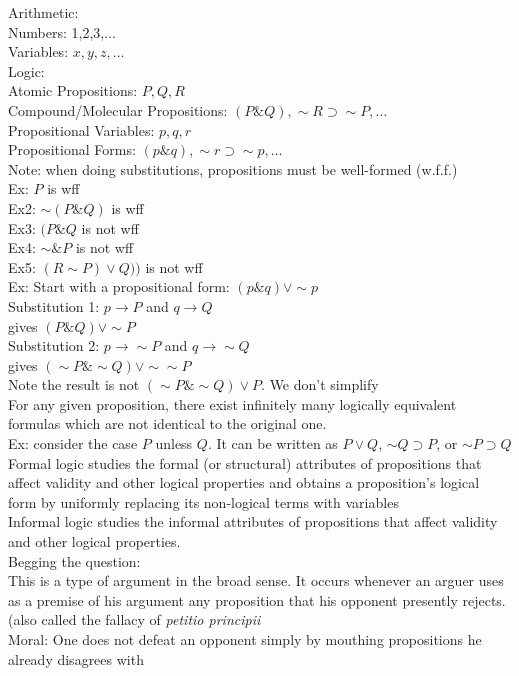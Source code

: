 \documentclass[11pt, fleqn]{article}
\begin{document}
Arithmetic:\\
Numbers: 1,2,3,$\ldots$\\
Variables: $x,y,z,\ldots$\\
Logic:\\
Atomic Propositions: $P,Q,R$\\
Compound/Molecular Propositions: $(P\&Q),\sim R\supset\sim P,\ldots$\\
Propositional Variables: $p,q,r$\\
Propositional Forms: $(p\&q),\sim r\supset\sim p,\ldots$\\
Note: when doing substitutions, propositions must be well-formed (w.f.f.)\\
Ex: $P$ is wff\\
Ex2: $\sim(P\&Q)$ is wff\\
Ex3: $(P\&Q$ is not wff\\
Ex4: $\sim \&P$ is not wff\\
Ex5: $(R\sim P)\vee Q))$ is not wff\\

Ex: Start with a propositional form: $(p\& q)\vee \sim p$\\
Substitution 1: $p\to P$ and $q\to Q$\\
gives $(P\&Q)\vee \sim P$\\
Substitution 2: $p\to \sim P$ and $q\to\sim Q$\\
gives $(\sim P\&\sim Q)\vee \sim\sim P$\\
Note the result is not $(\sim P\&\sim Q)\vee P$. We don't simplify\\
For any given proposition, there exist infinitely many logically equivalent formulas which are not identical to the original one.\\

Ex: consider the case $P$ unless $Q$. It can be written as $P\vee Q$, $\sim Q\supset P$, or $\sim P\supset Q$\\

Formal logic studies the formal (or structural) attributes of propositions that affect validity and other logical properties and obtains a proposition's logical form by uniformly replacing its non-logical terms with variables\\
Informal logic studies the informal attributes of propositions that affect validity and other logical properties.\\

Begging the question:\\
This is a type of argument in the broad sense. It occurs whenever an arguer uses as a premise of his argument any proposition that his opponent presently rejects. (also called the fallacy of \textit{petitio principii}\\
Moral: One does not defeat an opponent simply by mouthing propositions he already disagrees with\\
\end{document}
